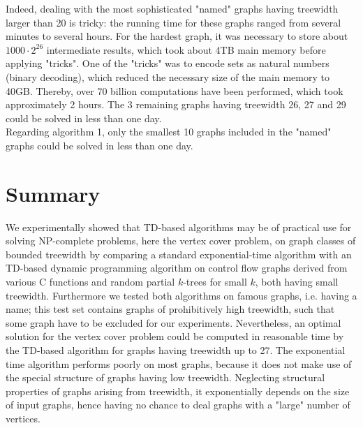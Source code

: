 \documentclass[11pt,a4paper]{article}
\begin{document}
Indeed, dealing with the most sophisticated "named" graphs having treewidth larger than 20 is tricky: the running time for these graphs ranged from several minutes to several hours. For the hardest graph, it was necessary to store about $1000 \cdot 2^{26}$ intermediate results, which took about 4TB main memory before applying "tricks". One of the "tricks" was to encode sets as natural numbers (binary decoding), which reduced the necessary size of the main memory to 40GB. Thereby, over 70 billion computations have been performed, which took approximately 2 hours. The 3 remaining graphs having treewidth 26, 27 and 29 could be solved in less than one day. \\

Regarding algorithm 1, only the smallest 10 graphs included in the "named" graphs could be solved in less than one day.

\section{Summary}

We experimentally showed that TD-based algorithms may be of practical use for solving NP-complete problems, here the vertex cover problem, on graph classes of bounded treewidth by comparing a standard exponential-time algorithm with an TD-based dynamic programming algorithm on control flow graphs derived from various C functions and random partial $k$-trees for small $k$, both having small treewidth. Furthermore we tested both algorithms on famous graphs, i.e. having a name; this test set contains graphs of prohibitively high treewidth, such that some graph have to be excluded for our experiments. Nevertheless, an optimal solution for the vertex cover problem could be computed in reasonable time by the TD-based algorithm for graphs having treewidth up to 27. The exponential time algorithm performs poorly on most graphs, because it does not make use of the special structure of graphs having low treewidth. Neglecting structural properties of graphs arising from treewidth, it exponentially depends on the size of input graphs, hence having no chance to deal graphs with a "large" number of vertices.


\end{document}
